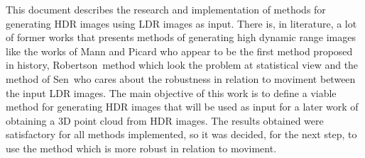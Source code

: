 This document describes the research and implementation of methods for generating HDR images using LDR images as input. There is, in literature, a lot of former works that presents methods of generating high dynamic range images like the works of Mann and Picard who appear to be the first method proposed in history, Robertson~\etal method which look the problem at statistical view and the method of Sen~\etal who cares about the robustness in relation to moviment between the input LDR images. The main objective of this work is to define a viable method for generating HDR images that will be used as input for a later work of obtaining a 3D point cloud from HDR images. The results obtained were satisfactory for all methods implemented, so it was decided, for the next step, to use the method which is more robust in relation to moviment.